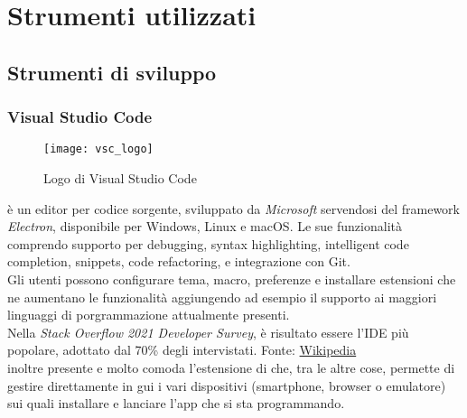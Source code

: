 
\chapter{Strumenti utilizzati}
\label{cap:strumenti-utilizzati}

\section{Strumenti di sviluppo}
\subsection{Visual Studio Code}
\begin{figure}[ht]
    \centering
    \texttt{[image: vsc\_logo]}
    \caption{Logo di Visual Studio Code}
\end{figure} \aCapo{}
\vsc{} è un editor per codice sorgente, sviluppato da \textit{Microsoft} servendosi del framework \textit{Electron}, disponibile per Windows, Linux e macOS. Le sue funzionalità comprendo supporto per debugging, syntax highlighting, intelligent code completion, snippets, code refactoring, e integrazione con Git. \\
Gli utenti possono configurare tema, macro, preferenze e installare estensioni che ne aumentano le funzionalità aggiungendo ad esempio il supporto ai maggiori linguaggi di porgrammazione attualmente presenti.\\
Nella \textit{Stack Overflow 2021 Developer Survey}, \vsc{} è risultato essere l'IDE più popolare, adottato dal 70\% degli intervistati. {\tiny Fonte: \href{https://en.wikipedia.org/wiki/Visual_Studio_Code}{Wikipedia}}\\
\E{} inoltre presente e molto comoda l'estensione di \flutter{} che, tra le altre cose, permette di gestire direttamente in gui i vari dispositivi (smartphone, browser o emulatore) sui quali installare e lanciare l'app che si sta programmando.

